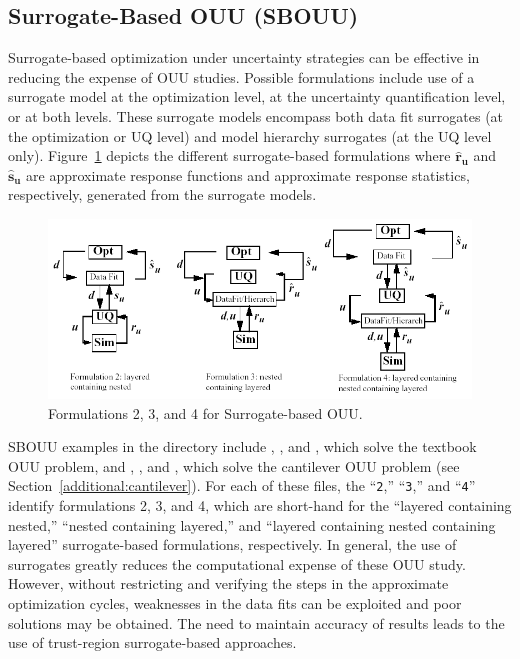 \subsection{Surrogate-Based OUU (SBOUU)}\label{adv_models:ouu:sb}

Surrogate-based optimization under uncertainty strategies can be
effective in reducing the expense of OUU studies. Possible
formulations include use of a surrogate model at the optimization
level, at the uncertainty quantification level, or at both levels.
These surrogate models encompass both data fit surrogates (at the
optimization or UQ level) and model hierarchy surrogates (at the UQ
level only). Figure~\ref{adv_models:figure10} depicts the different
surrogate-based formulations where $\mathbf{\hat{r}_{u}}$ and
$\mathbf{\hat{s}_{u}}$ are approximate response functions and
approximate response statistics, respectively, generated from the
surrogate models.

\begin{figure}
  \centering
  \includegraphics[scale=0.65]{images/sbouu}
  \caption{Formulations 2, 3, and 4 for Surrogate-based OUU.}
  \label{adv_models:figure10}
\end{figure}

SBOUU examples in the  directory include
, ,
and , which solve the textbook OUU
problem, and ,
, and
, which solve the cantilever OUU
problem (see Section~\ref{additional:cantilever}). For each of these
files, the ``\texttt{2},'' ``\texttt{3},'' and ``\texttt{4}'' identify
formulations 2, 3, and 4, which are short-hand for the ``layered
containing nested,'' ``nested containing layered,'' and ``layered
containing nested containing layered'' surrogate-based formulations,
respectively. In general, the use of surrogates greatly reduces the
computational expense of these OUU study. However, without restricting
and verifying the steps in the approximate optimization cycles,
weaknesses in the data fits can be exploited and poor solutions may be
obtained. The need to maintain accuracy of results leads to the use of
trust-region surrogate-based approaches.

